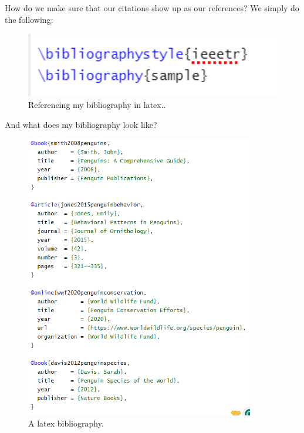 \documentclass[11pt]{article}
\begin{document}
How do we make sure that our citations show up as our references? We simply do the following:

\begin{figure}[H]
    \centering
    \includegraphics[width=15cm]{screenshot5.png}
    \caption{Referencing my bibliography in latex..}
    \label{fig:6}
\end{figure}


And what does my bibliography look like?

\begin{figure}[H]
    \centering
    \includegraphics[width=10cm]{screenshot4.png}
    \caption{A latex bibliography.}
    \label{fig:7}
\end{figure}
\end{document}
